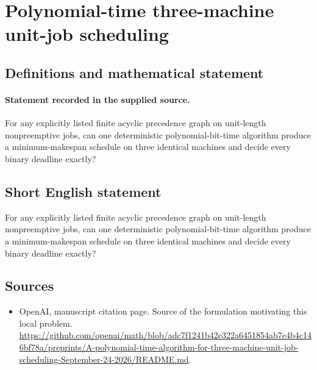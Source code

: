 \documentclass[11pt]{article}
\begin{document}
\section*{Polynomial-time three-machine unit-job scheduling}\label{30007488}
\subsection{Definitions and mathematical statement}
\paragraph{Statement recorded in the supplied source.}
For any explicitly listed finite acyclic precedence graph on unit-length nonpreemptive jobs, can one deterministic polynomial-bit-time algorithm produce a minimum-makespan schedule on three identical machines and decide every binary deadline exactly?
\subsection{Short English statement}
For any explicitly listed finite acyclic precedence graph on unit-length nonpreemptive jobs, can one deterministic polynomial-bit-time algorithm produce a minimum-makespan schedule on three identical machines and decide every binary deadline exactly?
\subsection{Sources}
\begin{itemize}
\item[S1] OpenAI, manuscript citation page. Source of the formulation motivating this local problem.
\url{https://github.com/openai/math/blob/adc7f1241b42e322a6451854ab7e4b4c146bf78a/preprints/A-polynomial-time-algorithm-for-three-machine-unit-job-scheduling-September-24-2026/README.md}.
\end{itemize}
\end{document}
